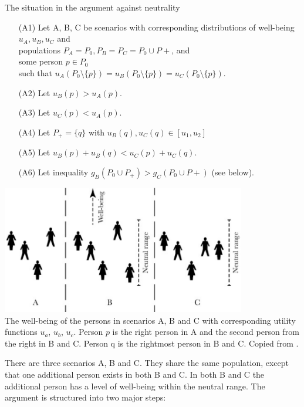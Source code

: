 \begin{Counterexample}{The situation in the argument against neutrality}{}
\begin{enumerate}
\item[(A1)]
Let A, B, C be scenarios with  
corresponding distributions of well-being $u_A, u_B, u_C$ and \\
populations $P_A = P_0, P_B = P_C = P_0 \cup P+$, and \\
some person $p \in P_0$ \\
such that $u_A(P_0 \setminus \{p\}) = u_B(P_0 \setminus \{p\}) = u_C(P_0 \setminus \{p\}).$
\item[(A2)] Let $u_B(p) > u_A(p).$
\item[(A3)] Let $u_C(p) < u_A(p).$
\item[(A4)] Let $P_+ = \{q\}$ with $u_B(q), u_C(q) \in [u_1, u_2]$
\item[(A5)] Let $u_B(p) + u_B(q) < u_C(p) + u_C(q).$
\item[(A6)] Let inequality $g_B(P_0 \cup P_+) > g_C(P_0 \cup P+)$ (see below). 
\end{enumerate}
\begin{center}
  \includegraphics[width=0.8\textwidth]{3-fig-1} \\
  \footnotesize The well-being of the persons in scenarios A, B and C with corresponding utility functions $u_a$, $u_b$, $u_c$. Person $p$ is the right person in A and the second person from the right in B and C. Person q is the rightmost person in B and C. Copied from .
\end{center}
\end{Counterexample}

There are three scenarios A, B and C. They share the same population, except that one additional person exists in both B and C. In both B and C the additional person has a level of well-being within the neutral range. The argument is structured into two major steps:  

